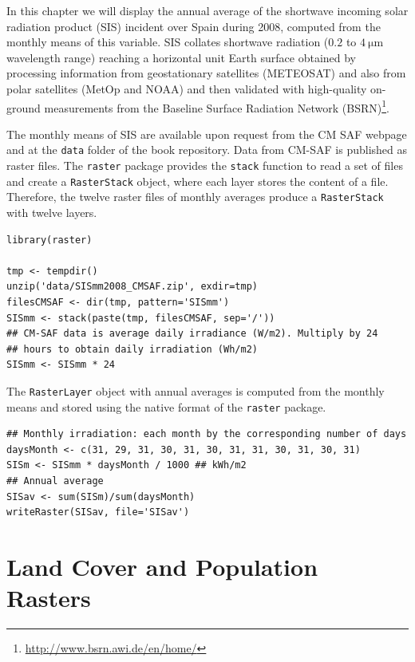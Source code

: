 \documentclass[smallroyalvopaper]{memoir}
\begin{document}
In this chapter we will display the annual average of the shortwave
incoming solar radiation product (SIS) incident over Spain during
2008, computed from the monthly means of this variable. SIS collates
shortwave radiation ($0.2$ to $\SI{4}{\micro\meter}$ wavelength range)
reaching a horizontal unit Earth surface obtained by processing
information from geostationary satellites (METEOSAT) and also from
polar satellites (MetOp and NOAA) \cite{Schulz.Albert.ea2009} and then
validated with high-quality on-ground measurements from the Baseline
Surface Radiation Network (BSRN)\footnote{\url{http://www.bsrn.awi.de/en/home/}}.

The monthly means of SIS are available upon request from the CM SAF
webpage \cite{Posselt.Muller.ea2011} and at the \texttt{data} folder of the
book repository. Data from CM-SAF is published as raster files. The
\texttt{raster} package provides the \texttt{stack} function to read a set of files
and create a \texttt{RasterStack} object, where each layer stores the content
of a file. Therefore, the twelve raster files of monthly averages
produce a \texttt{RasterStack} with twelve layers.


\lstset{language=R,numbers=none}
\begin{lstlisting}
library(raster)

tmp <- tempdir()
unzip('data/SISmm2008_CMSAF.zip', exdir=tmp)
filesCMSAF <- dir(tmp, pattern='SISmm')
SISmm <- stack(paste(tmp, filesCMSAF, sep='/'))
## CM-SAF data is average daily irradiance (W/m2). Multiply by 24
## hours to obtain daily irradiation (Wh/m2)
SISmm <- SISmm * 24
\end{lstlisting}

The \texttt{RasterLayer} object with annual averages is computed from the
monthly means and stored using the native format of the \texttt{raster}
package.
\lstset{language=R,numbers=none}
\begin{lstlisting}
## Monthly irradiation: each month by the corresponding number of days
daysMonth <- c(31, 29, 31, 30, 31, 30, 31, 31, 30, 31, 30, 31)
SISm <- SISmm * daysMonth / 1000 ## kWh/m2
## Annual average
SISav <- sum(SISm)/sum(daysMonth)
writeRaster(SISav, file='SISav')
\end{lstlisting}

\section{Land Cover and Population Rasters}
\label{sec-4}
\end{document}

